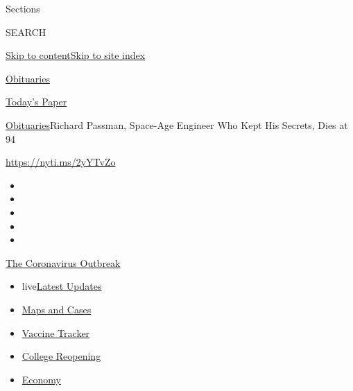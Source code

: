 Sections

SEARCH

\protect\hyperlink{site-content}{Skip to
content}\protect\hyperlink{site-index}{Skip to site index}

\href{https://www.nytimes.com/section/obituaries}{Obituaries}

\href{https://myaccount.nytimes.com/auth/login?response_type=cookie\&client_id=vi}{}

\href{https://www.nytimes.com/section/todayspaper}{Today's Paper}

\href{/section/obituaries}{Obituaries}\textbar{}Richard Passman,
Space-Age Engineer Who Kept His Secrets, Dies at 94

\url{https://nyti.ms/2yYTvZo}

\begin{itemize}
\item
\item
\item
\item
\item
\end{itemize}

\href{https://www.nytimes.com/news-event/coronavirus?action=click\&pgtype=Article\&state=default\&region=TOP_BANNER\&context=storylines_menu}{The
Coronavirus Outbreak}

\begin{itemize}
\tightlist
\item
  live\href{https://www.nytimes.com/2020/08/03/world/coronavirus-covid-19.html?action=click\&pgtype=Article\&state=default\&region=TOP_BANNER\&context=storylines_menu}{Latest
  Updates}
\item
  \href{https://www.nytimes.com/interactive/2020/us/coronavirus-us-cases.html?action=click\&pgtype=Article\&state=default\&region=TOP_BANNER\&context=storylines_menu}{Maps
  and Cases}
\item
  \href{https://www.nytimes.com/interactive/2020/science/coronavirus-vaccine-tracker.html?action=click\&pgtype=Article\&state=default\&region=TOP_BANNER\&context=storylines_menu}{Vaccine
  Tracker}
\item
  \href{https://www.nytimes.com/2020/08/02/us/covid-college-reopening.html?action=click\&pgtype=Article\&state=default\&region=TOP_BANNER\&context=storylines_menu}{College
  Reopening}
\item
  \href{https://www.nytimes.com/live/2020/08/03/business/stock-market-today-coronavirus?action=click\&pgtype=Article\&state=default\&region=TOP_BANNER\&context=storylines_menu}{Economy}
\end{itemize}

